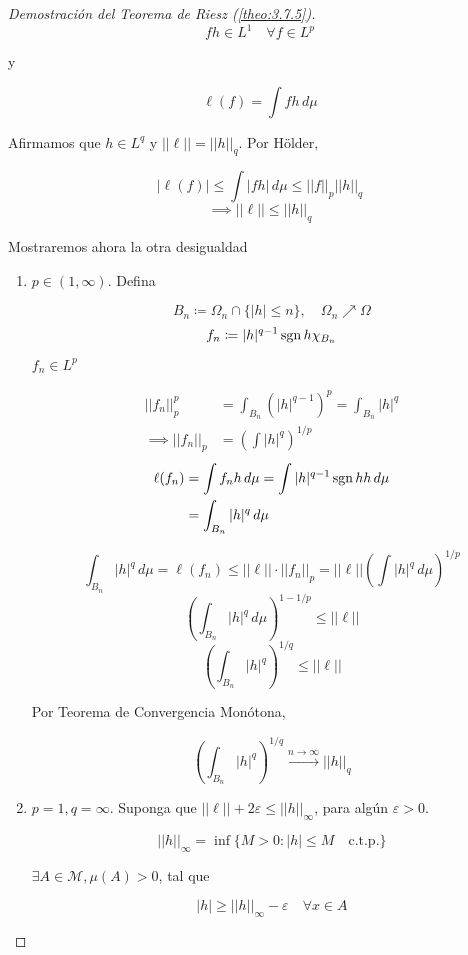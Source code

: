 \begin{proof}[Demostración del Teorema de Riesz (\ref{theo:3.7.5})]
        \[fh\in L^1\quad\forall f\in L^p\]

        y 

        \[\ell(f)=\int fh\,d\mu\]

        Afirmamos que $h\in L^q$ y $||\ell||=||h||_q$. Por Hölder,

        \[|\ell(f)|\leq \int |fh|\,d\mu\leq ||f||_p||h||_q\]
        \[\implies ||\ell||\leq ||h||_q\]

        Mostraremos ahora la otra desigualdad

        \begin{enumerate}[label=(\alph*)]
            \item $p\in (1,\infty)$. Defina 
            
            \[B_n\coloneqq\Omega_n\cap \{|h|\leq n\},\quad\Omega_n\nearrow \Omega\]
            \[f_n\coloneqq |h|^{q-1}\operatorname{sgn} h\chi_{B_n}\]

            $f_n\in L^p$

            \begin{align*}
                ||f_n||_p^p&=\int_{B_n}(|h|^{q-1})^p=\int_{B_n}|h|^q\\
                \implies ||f_n||_p&=\left(\int |h|^q\right)^{1/p}
            \end{align*}
            \begin{align*}
                \ell(f_n)&=\int f_nh\,d\mu=\int |h|^{q-1}\operatorname{sgn} h h\,d\mu\\
                &=\int_{B_n}|h|^q\,d\mu
            \end{align*}

            \[\int_{B_n}|h|^q \,d\mu=\ell(f_n)\leq ||\ell||\cdot ||f_n||_p=||\ell||\left(\int |h|^q\,d\mu\right)^{1/p}\]
            \[\left(\int_{B_n}|h|^q \,d\mu\right)^{1-1/p}\leq ||\ell||\]
            \[\left(\int_{B_n}|h|^q\right)^{1/q}\leq ||\ell||\]

            Por Teorema de Convergencia Monótona,

            \[\left(\int_{B_n}|h|^q\right)^{1/q}\xrightarrow{n\to\infty} ||h||_q\]

            \item $p=1, q=\infty$. Suponga que $||\ell||+2\varepsilon\leq ||h||_\infty$, para algún $\varepsilon>0$.
            
            \[||h||_\infty=\inf\{M>0:|h|\leq M\quad \text{c.t.p.}\}\]

            $\exists A\in\mathcal{M},\mu(A)>0$, tal que 

            \[|h|\geq ||h||_\infty-\varepsilon\quad\forall x\in A\]


\end{enumerate}
\end{proof}
